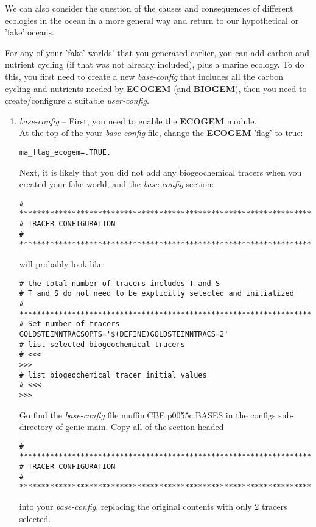 \documentclass[11pt,fleqn]{book} %
\begin{document}
%
We can also consider the question of the causes and consequences of different ecologies in the ocean in a more general way and return to our hypothetical or 'fake' oceans.

For any of your 'fake' worlds' that you generated earlier, you can add carbon and nutrient cycling (if that was not already included), plus a marine ecology. To do this, you first need to create a new \textit{base-config} that includes all the carbon cycling and nutrients needed by \textbf{ECOGEM} (and \textbf{BIOGEM}), then you need to create/configure a suitable \textit{user-config}.

\begin{enumerate}[noitemsep]

\vspace{1mm}
\item \textit{base-config} -- First, you need to enable the \textbf{ECOGEM} module.
\\At the top of the your \textit{base-config} file, change the \textbf{ECOGEM} 'flag' to true:
\vspace{-1mm}\begin{verbatim}
ma_flag_ecogem=.TRUE.
\end{verbatim}\vspace{-1mm}
Next, it is likely that you did not add any biogeochemical tracers when you created your fake world, and the \textit{base-config} section: 
\footnotesize\begin{verbatim}
# *******************************************************************
# TRACER CONFIGURATION
# *******************************************************************
\end{verbatim}\normalsize
will probably look like:
\footnotesize\begin{verbatim}
# the total number of tracers includes T and S
# T and S do not need to be explicitly selected and initialized
# *******************************************************************
# Set number of tracers
GOLDSTEINNTRACSOPTS='$(DEFINE)GOLDSTEINNTRACS=2'
# list selected biogeochemical tracers
# <<<                                                             >>>
# list biogeochemical tracer initial values
# <<<                                                             >>>
\end{verbatim}\normalsize
Go find the \textit{base-config} file \textsf{\footnotesize muffin.CBE.p0055c.BASES} in the \textsf{\footnotesize configs} sub-directory of \textsf{\footnotesize genie-main}. Copy all of the section headed 
\footnotesize\begin{verbatim}
# *******************************************************************
# TRACER CONFIGURATION
# *******************************************************************
\end{verbatim}\normalsize
into your \textit{base-config}, replacing the original contents with only 2 tracers selected.


\end{enumerate}
\end{document}

